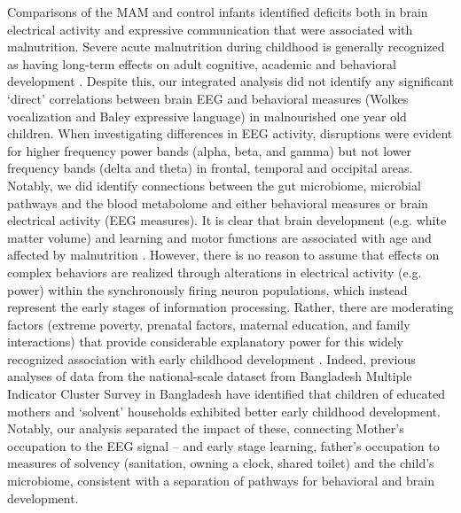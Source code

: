 \documentclass{article}
\begin{document}
Comparisons of the \gls{MAM} and control infants identified deficits both in brain electrical activity and expressive communication that were associated with malnutrition.
Severe acute malnutrition during childhood is generally recognized as having long-term effects on adult cognitive, academic and behavioral development \cite{mwene2020long}.
Despite this, our integrated analysis did not identify any significant ‘direct’ correlations between brain EEG and behavioral measures (Wolkes vocalization and Baley expressive language) in malnourished one year old children.
When investigating differences in EEG activity, disruptions were evident for higher frequency power bands (alpha, beta, and gamma) but not lower frequency bands (delta and theta) in frontal, temporal and occipital areas.
Notably, we did identify connections between the gut microbiome, microbial pathways and the blood metabolome and either behavioral measures or brain electrical activity (EEG measures).
It is clear that brain development (e.g. white matter volume) and learning and motor functions are associated with age and affected by malnutrition \cite{fields2008white, galler2021neurodevelopmental}.
However, there is no reason to assume that effects on complex behaviors are realized through alterations in electrical activity (e.g. power) within the synchronously firing neuron populations, which instead represent the early stages of information processing.
Rather, there are moderating factors (extreme poverty, prenatal factors, maternal education, and family interactions) that provide considerable explanatory power for this widely recognized association with early childhood development \cite{alam2022early}.
Indeed, previous analyses of data from the national-scale dataset from Bangladesh Multiple Indicator Cluster Survey in Bangladesh have identified that children of educated mothers and ‘solvent’ households exhibited better early childhood development.
Notably, our analysis separated the impact of these, connecting Mother’s occupation to the EEG signal – and early stage learning, father’s occupation to measures of solvency (sanitation, owning a clock, shared toilet) and the child’s microbiome, consistent with a separation of pathways for behavioral and brain development.  
\end{document}
